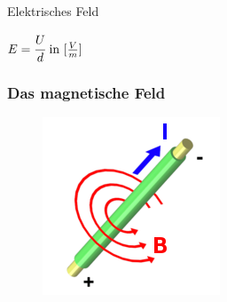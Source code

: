 \begin{frame}
  \begin{block}{Elektrisches Feld}
    \begin{center}
      \huge$E = \cfrac{U}{d} \text{ in } [\frac{V}{m}]$\\
    \end{center}
  \end{block}
\end{frame}

\begin{frame}
  \frametitle{Das magnetische Feld}

  \begin{center}
    \begin{minipage}{0.45\textwidth}
      \begin{center}
        \begin{figure}
          \includegraphics[width=\textwidth,height=.3\textheight,keepaspectratio]{e08/RechteHand.png}
        \end{figure}
      \end{center}
    \end{minipage}
    \begin{minipage}{0.45\textwidth}

\end{minipage}
\end{center}
\end{frame}
